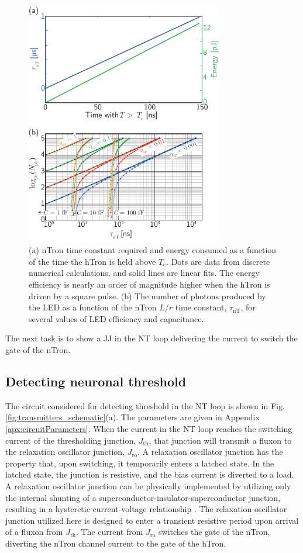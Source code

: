 \documentclass[twocolumn]{article}
\begin{document}
\begin{figure}[t!]
	\centerline{\includegraphics[width=8.6cm]{_transmitters_hTron_data_2_small.pdf}}
	\caption{\label{fig:transmitters_hTron_data_2}(a) nTron time constant required and energy consumed as a function of the time the hTron is held above $T_{\mathrm{c}}$. Dots are data from discrete numerical calculations, and solid lines are linear fits. The energy efficiency is nearly an order of magnitude higher when the hTron is driven by a square pulse. (b) The number of photons produced by the LED as a function of the nTron $L/r$ time constant, $\tau_{\mathrm{nT}}$, for several values of LED efficiency and capacitance.}
\end{figure}
The next task is to show a JJ in the NT loop delivering the current to switch the gate of the nTron.
	
\subsection{\label{sec:detectingThreshold}Detecting neuronal threshold}
The circuit considered for detecting threshold in the NT loop is shown in Fig.\,\ref{fig:transmitters_schematic}(a). The parameters are given in Appendix \ref{apx:circuitParameters}. When the current in the NT loop reaches the switching current of the thresholding junction, $J_{\mathrm{th}}$, that junction will transmit a fluxon to the relaxation oscillator junction, $J_{\mathrm{ro}}$. A relaxation oscillator junction has the property that, upon switching, it temporarily enters a latched state. In the latched state, the junction is resistive, and the bias current is diverted to a load. A relaxation oscillator junction can be physically implemented by utilizing only the internal shunting of a superconductor-insulator-superconductor junction, resulting in a hysteretic current-voltage relationship \cite{vatu1998}. The relaxation oscillator junction utilized here is designed to enter a transient resistive period upon arrival of a fluxon from $J_{\mathrm{th}}$. The current from $J_{\mathrm{ro}}$ switches the gate of the nTron, diverting the nTron channel current to the gate of the hTron. 
\end{document}
